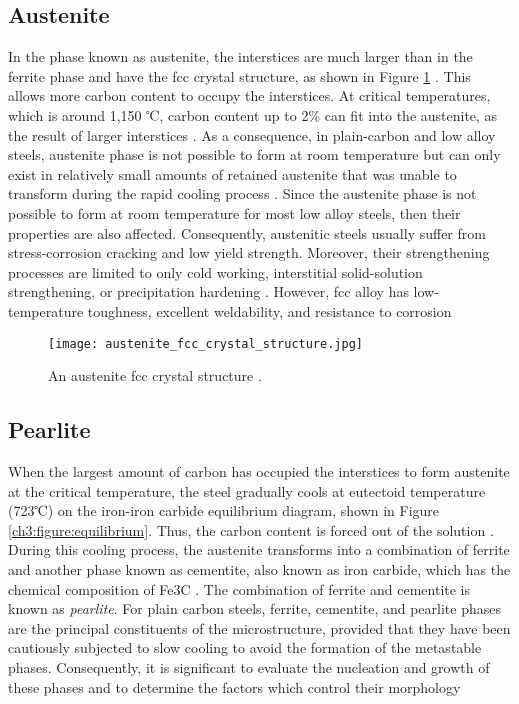 \subsection{Austenite} 
In the phase known as austenite, the interstices are much larger than in the ferrite phase and have the fcc crystal structure, as shown in Figure \ref{ch3:figure:austenite} \cite{bajaj2020steels}. This allows more carbon content to occupy the interstices. At critical temperatures, which is around 1,150 ℃, carbon content up to 2\% can fit into the austenite, as the result of larger interstices \cite{bhadeshia2017steels}. As a consequence, in plain-carbon and low alloy steels, austenite phase is not possible to form at room temperature but can only exist in relatively small amounts of retained austenite that was unable to transform during the rapid cooling process \cite{molabe2018determining}.
Since the austenite phase is not possible to form at room temperature for most low alloy steels, then their properties are also affected. Consequently, austenitic steels usually suffer from stress-corrosion cracking and low yield strength. Moreover, their strengthening processes are limited to only cold working, interstitial solid-solution strengthening, or precipitation hardening \cite{molabe2018determining}. However, fcc alloy has low-temperature toughness, excellent weldability, and resistance to corrosion \cite{bhadeshia2017steels}
 
\begin{figure}[H]
    \centering
    \texttt{[image: austenite\_fcc\_crystal\_structure.jpg]}
    \caption{An austenite fcc crystal structure \cite{bajaj2020steels}.}
    \label{ch3:figure:austenite}
\end{figure}

\subsection{Pearlite} 
When the largest amount of carbon has occupied the interstices to form austenite at the critical temperature, the steel gradually cools at eutectoid temperature (723℃) on the iron-iron carbide equilibrium diagram, shown in Figure \ref{ch3:figure:equilibrium}. Thus, the carbon content is forced out of the solution \cite{bhadeshia2017steels}. During this cooling process, the austenite transforms into a combination of ferrite and another phase known as cementite, also known as iron carbide, which has the chemical composition of Fe3C \cite{cmrp2014maintenance}. The combination of ferrite and cementite is known as \emph{pearlite}.  
For plain carbon steels, ferrite, cementite, and pearlite phases are the principal constituents of the microstructure, provided that they have been cautiously subjected to slow cooling to avoid the formation of the metastable phases. Consequently, it is significant to evaluate the nucleation and growth of these phases and to determine the factors which control their morphology \cite{bhadeshia2017steels}

